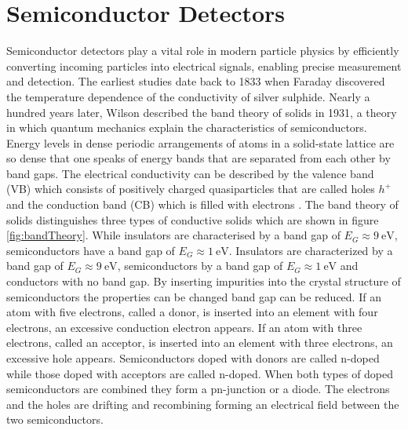 \chapter{Semiconductor Detectors}\label{Semiconductors}

Semiconductor detectors play a vital role in modern particle physics by efficiently converting incoming particles into electrical signals, enabling precise measurement and detection.
The earliest studies date back to 1833 when Faraday discovered the temperature dependence of the conductivity of silver sulphide.
Nearly a hundred years later, Wilson described the band theory of solids in 1931, a theory in which quantum mechanics explain the characteristics of semiconductors.
Energy levels in dense periodic arrangements of atoms in a solid-state lattice are so dense that one speaks of energy bands that are separated from each other by band gaps.
The electrical conductivity can be described by the valence band (VB) which consists of positively charged quasiparticles that are called holes $h^+$ and the conduction band (CB) which is filled with electrons \cite{KolanoskiWermes}.
The band theory of solids distinguishes three types of conductive solids which are shown in figure \ref{fig:bandTheory}.
While insulators are characterised by a band gap of $E_G\approx \SI{9}{\eV}$, semiconductors have a band gap of $E_G\approx \SI{1}{\eV}$.
Insulators are characterized by a band gap of $E_G\approx \SI{9}{\eV}$, semiconductors by a band gap of $E_G\approx \SI{1}{\eV}$ and conductors with no band gap.
By inserting impurities into the crystal structure of semiconductors the properties can be changed band gap can be reduced.
If an atom with five electrons, called a donor, is inserted into an element with four electrons, an excessive conduction electron appears.
If an atom with three electrons, called an acceptor, is inserted into an element with three electrons, an excessive hole appears.
Semiconductors doped with donors are called n-doped while those doped with acceptors are called n-doped.
When both types of doped semiconductors are combined they form a pn-junction or a diode.
The electrons and the holes are drifting and recombining forming an electrical field between the two semiconductors.
